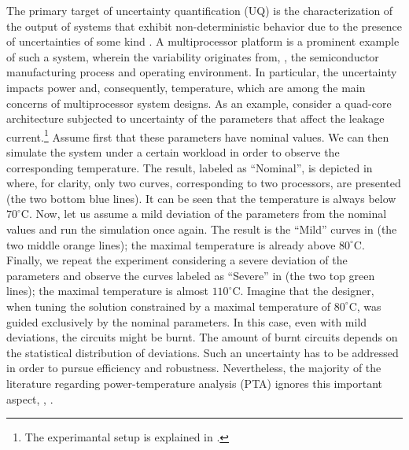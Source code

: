  The primary target of uncertainty quantification (UQ) is the characterization of the output of systems that exhibit non-deterministic behavior due to the presence of uncertainties of some kind \cite{xiu2010, eldred2009}. A multiprocessor platform is a prominent example of such a system, wherein the variability originates from, \eg, the semiconductor manufacturing process and operating environment. In particular, the uncertainty impacts power and, consequently, temperature, which are among the main concerns of multiprocessor system designs. As an example, consider a quad-core architecture subjected to uncertainty of the parameters that affect the leakage current.\footnote{The experimantal setup is explained in .} Assume first that these parameters have nominal values. We can then simulate the system under a certain workload in order to observe the corresponding temperature. The result, labeled as ``Nominal'', is depicted in  where, for clarity, only two curves, corresponding to two processors, are presented (the two bottom blue lines). It can be seen that the temperature is always below $70^{\circ}$C. Now, let us assume a mild deviation of the parameters from the nominal values and run the simulation once again. The result is the ``Mild'' curves in  (the two middle orange lines); the maximal temperature is already above $80^{\circ}$C. Finally, we repeat the experiment considering a severe deviation of the parameters and observe the curves labeled as ``Severe'' in  (the two top green lines); the maximal temperature is almost $110^{\circ}$C. Imagine that the designer, when tuning the solution constrained by a maximal temperature of $80^\circ$C, was guided exclusively by the nominal parameters. In this case, even with mild deviations, the circuits might be burnt. The amount of burnt circuits depends on the statistical distribution of deviations. Such an uncertainty has to be addressed in order to pursue efficiency and robustness. Nevertheless, the majority of the literature regarding power-temperature analysis (PTA) ignores this important aspect, \eg, \cite{rao2009, rai2011, thiele2011, ukhov2012}.

